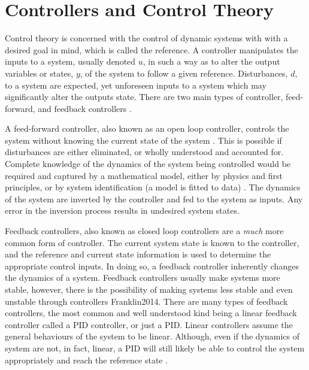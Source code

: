 \section{Controllers and Control Theory}
Control theory is concerned with the control of dynamic systems with with a desired goal in mind, which is called the reference. A controller manipulates the inputs to a system, usually denoted $u$, in such a way as to alter the output variables or states, $y$, of the system to follow a given reference. Disturbances, $d$, to a system are expected, yet unforeseen inputs to a system which may significantly alter the outputs state.  There are two main types of controller, feed-forward, and feedback controllers \cite{Franklin2014}.

A feed-forward controller, also known as an open loop controller, controls the system without knowing the current state of the system \cite{vries_learning_2000}. This is possible if disturbances are either eliminated, or wholly understood and accounted for. Complete knowledge of the dynamics of the system being controlled would be required and captured by a mathematical model, either by physics and first principles, or by system identification (a model is fitted to data) \cite{vries_learning_2000}. The dynamics of the system are inverted by the controller and fed to the system as inputs. Any error in the inversion process results in undesired system states. 

Feedback controllers, also known as closed loop controllers are a \textit{much} more common form of controller. The current system state is known to the controller, and the reference and current state information is used to determine the appropriate control inputs. In doing so, a feedback controller inherently changes the dynamics of a system. Feedback controllers usually make systems more stable, however, there is the possibility of making systems less stable and even unstable through controllers {Franklin2014}. There are many types of feedback controllers, the most common and well understood kind being a linear feedback controller called a \ac{PID} controller, or just a \ac{PID}. Linear controllers assume the general behaviours of the system to be linear. Although, even if the dynamics of system are not, in fact, linear, a \ac{PID} will still likely be able to control the system appropriately and reach the reference state \cite{Rames_2012}.

